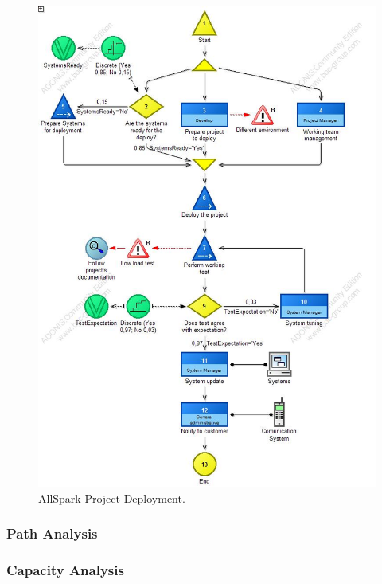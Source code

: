 \begin{figure}[ht!]
\begin{centering}
\includegraphics[scale=0.50]{assign2/adonis/imgs/deploy.jpg}
\caption{AllSpark Project Deployment.}
\label{2img:deploy}
\end{centering}
\end{figure}


\subsubsection{Path Analysis}

\begin{alltt}

\end{alltt}


\subsubsection{Capacity Analysis}



